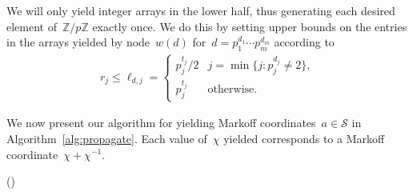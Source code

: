 \documentclass{article}
\theoremstyle{definition}
\theoremstyle{remark}
\begin{document}
We will only yield integer arrays in the lower half, thus generating each desired element of~$\mathbb{Z} / p\mathbb{Z}$ exactly once.
We do this by setting upper bounds on the entries in the arrays yielded by node~$w(d)$ for~$d = p_1^{d_1} \cdots p_m^{d_m}$ according to
\begin{align}\label{eq:upper-bounds}
    r_j \leq \ell_{d,j} =
    \begin{cases}
        p_j^{t_j} / 2 & j = \min\{j : p_j^{d_j} \neq 2\}, \\
        p_j^{t_j} & \text{otherwise}.
    \end{cases}
\end{align}

We now present our algorithm for yielding Markoff coordinates~$a \in \mathcal{S}$ in Algorithm~\ref{alg:propagate}.
Each value of~$\chi$ yielded corresponds to a Markoff coordinate~$\chi + \chi^{-1}$.

\begin{algorithm}[h]
    \SetAlgoLined%

    \Fn(){}{%
    }
    \caption{%
        Generating $\chi$ corresponding to desired Markoff coordinates $\chi + \chi^{-1} \in \mathcal{S}$.%
        \label{alg:propagate}
    }
\end{algorithm}%
\end{document}
